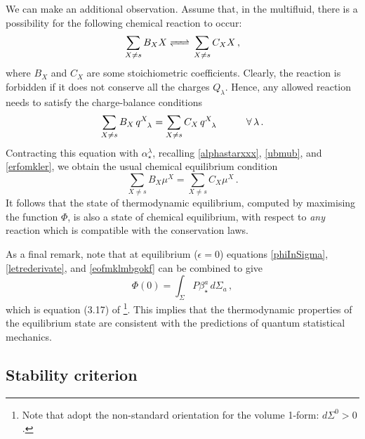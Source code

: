 \documentclass[a4paper, amsfonts, amssymb, amsmath, reprint, showkeys, nofootinbib, twoside, onecolumn,notitlepage]{revtex4-1}
\newcommand{\spc}{\quad \quad \quad}
\theoremstyle{definition}
\theoremstyle{theorem}
\begin{document}
We can make an additional observation. Assume that, in the multifluid, there is a possibility for the following chemical reaction to occur:
\begin{equation}
\sum_{X\neq s} B_X X \ce{ <=> }  \sum_{X\neq s} C_X X \, , 
\end{equation}
where $B_X$ and $C_X$ are some stoichiometric coefficients. Clearly, the reaction is forbidden if it does not conserve all the charges $Q_\lambda$. Hence, any allowed reaction needs to satisfy the charge-balance conditions
\begin{equation}
\sum_{X\neq s} B_X \, q\indices{^X _\lambda}  = \sum_{X\neq s} C_X \, q\indices{^X _\lambda}  \spc \forall \, \lambda \, .
\end{equation}
Contracting this equation with $\alpha_\star^\lambda$, recalling \eqref{alphastarxxx}, \eqref{ubmub}, and \eqref{erfomkler}, we obtain the usual chemical equilibrium condition
\begin{equation}
\sum_{X\neq s} B_X \mu^X = \sum_{X\neq s} C_X \mu^X \, .
\end{equation}
It follows that the state of thermodynamic equilibrium, computed by maximising the function $\Phi$, is also a state of chemical equilibrium, with respect to \textit{any} reaction which is compatible with the conservation laws.

As a final remark, note that at equilibrium ($\epsilon=0$) equations \eqref{phiInSigma}, \eqref{letrederivate}, and \eqref{eofmklmbgokf} can be combined to give
\begin{equation}
\Phi(0) = \int_\Sigma P  \beta^a_\star \, d\Sigma_a  \, ,
\end{equation}
which is equation (3.17) of \citet{GibbonsHawking1977}\footnote{Note that \citet{GibbonsHawking1977} adopt the non-standard orientation for the volume 1-form: $d\Sigma^0 >0$.}. This implies that the thermodynamic properties of the equilibrium state are consistent with the predictions of quantum statistical mechanics.

\subsection{Stability criterion}\label{criteriuz}
\end{document}
